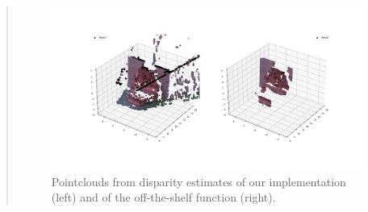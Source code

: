 \documentclass[11pt]{article}
\begin{document}
\begin{quote}
\begin{figure}[h]
    \centering
    \includegraphics[width=1.0\linewidth]{disparity_to_pointcloud.png}
    \caption{Pointclouds from disparity estimates of our implementation (left) and of the off-the-shelf function (right).}
    \label{fig:disparity2pcd}
\end{figure}

\end{quote}





\end{document}
